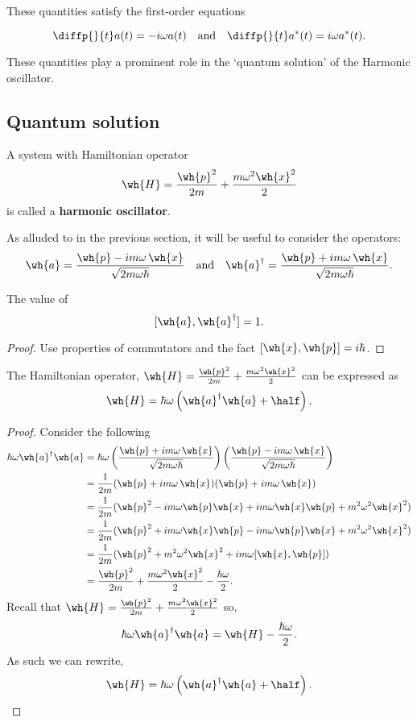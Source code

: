 \documentclass[12pt, a4paper]{article}
\begin{document}
These quantities satisfy the first-order equations 

\[\diffp{}{t}a(t)= -i\omega a(t) \quad \text{and} \quad \diffp{}{t}a^*(t)=i\omega a^*(t).\]

These quantities play a prominent role in the `quantum solution' of the Harmonic oscillator.

\subsection{Quantum solution}

\begin{definition}
    A system with Hamiltonian operator 
    \[\wh{H}=\frac{\wh{p}^2}{2m}+\frac{m\omega^2 \wh{x}^2}{2}\]
    is called a \textbf{harmonic oscillator}.
\end{definition}

As alluded to in the previous section, it will be useful to consider the operators:
\[\wh{a} = \frac{\wh{p}-im\omega \, \wh{x}}{\sqrt{2m\omega \hbar}} 
\quad \text{and} \quad
\wh{a}^{\dagger} = \frac{\wh{p}+im\omega \, \wh{x}}{\sqrt{2m\omega \hbar}}.\]

\begin{proposition}
    The value of 
    \[[\wh{a},\wh{a}^{\dagger}]=1.\]
\end{proposition}

\begin{proof}
    Use properties of commutators and the fact \([\wh{x},\wh{p}]=i\hbar\).
\end{proof}

\begin{mdthm}
    The Hamiltonian operator, \(\wh{H}=\frac{\wh{p}^2}{2m}+\frac{m\omega^2 \wh{x}^2}{2}\) can be expressed as
    \[\wh{H}=\hbar \omega \left( \wh{a}^{\dagger} \wh{a} + \half \right).\]
\end{mdthm}

\begin{proof}
    Consider the following 
    \[\begin{aligned}
        \hbar \omega \wh{a}^{\dagger}\wh{a} &=\hbar \omega \left( \frac{\wh{p}+im\omega \, \wh{x}}{\sqrt{2m\omega \hbar}} \right) \left( \frac{\wh{p}-im\omega \, \wh{x}}{\sqrt{2m\omega \hbar}} \right) \\
        &=\frac{1}{2m} ( \wh{p}+im\omega \, \wh{x} )(\wh{p}+im\omega \, \wh{x}) \\
        &= \frac{1}{2m} (\wh{p}^2 -im\omega \wh{p}\wh{x} +im\omega \wh{x}\wh{p}+ m^2\omega^2 \wh{x}^2) \\
        &= \frac{1}{2m} (\wh{p}^2 +im\omega \wh{x}\wh{p}  -im\omega \wh{p}\wh{x}+m^2\omega^2 \wh{x}^2) \\
        &= \frac{1}{2m} (\wh{p}^2+m^2\omega^2\wh{x}^2+im\omega[\wh{x},\wh{p}]) \\
        &= \frac{\wh{p}^2}{2m} + \frac{m\omega^2 \wh{x}^2}{2}-\frac{\hbar \omega}{2}.
    \end{aligned}\]
    Recall that \(\wh{H}=\frac{\wh{p}^2}{2m} + \frac{m\omega^2 \wh{x}^2}{2}\) so, 
    \[\hbar \omega \wh{a}^{\dagger}\wh{a} = \wh{H}- \frac{\hbar \omega}{2}.\]
    As such we can rewrite, 
    \[\wh{H}=\hbar \omega \left( \wh{a}^{\dagger} \wh{a} + \half \right).\]
\end{proof}
\end{document}
